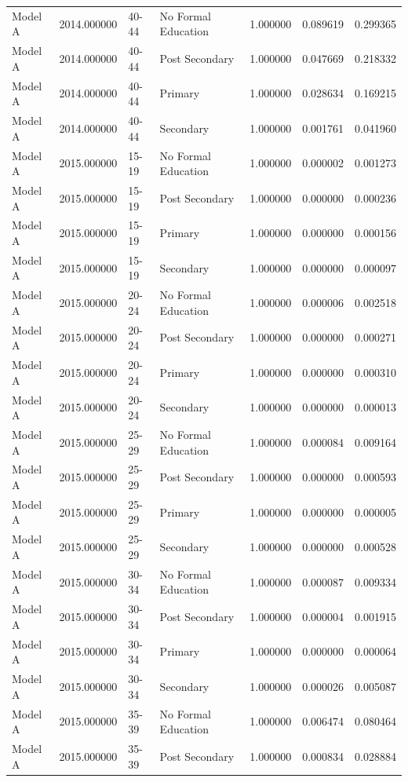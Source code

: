 \begin{table}[ht]
\begin{tabular}{lrllrrr}
Model A & 2014.000000 & 40-44 & No Formal Education & 1.000000 & 0.089619 & 0.299365 \\
Model A & 2014.000000 & 40-44 & Post Secondary & 1.000000 & 0.047669 & 0.218332 \\
Model A & 2014.000000 & 40-44 & Primary & 1.000000 & 0.028634 & 0.169215 \\
Model A & 2014.000000 & 40-44 & Secondary & 1.000000 & 0.001761 & 0.041960 \\
Model A & 2015.000000 & 15-19 & No Formal Education & 1.000000 & 0.000002 & 0.001273 \\
Model A & 2015.000000 & 15-19 & Post Secondary & 1.000000 & 0.000000 & 0.000236 \\
Model A & 2015.000000 & 15-19 & Primary & 1.000000 & 0.000000 & 0.000156 \\
Model A & 2015.000000 & 15-19 & Secondary & 1.000000 & 0.000000 & 0.000097 \\
Model A & 2015.000000 & 20-24 & No Formal Education & 1.000000 & 0.000006 & 0.002518 \\
Model A & 2015.000000 & 20-24 & Post Secondary & 1.000000 & 0.000000 & 0.000271 \\
Model A & 2015.000000 & 20-24 & Primary & 1.000000 & 0.000000 & 0.000310 \\
Model A & 2015.000000 & 20-24 & Secondary & 1.000000 & 0.000000 & 0.000013 \\
Model A & 2015.000000 & 25-29 & No Formal Education & 1.000000 & 0.000084 & 0.009164 \\
Model A & 2015.000000 & 25-29 & Post Secondary & 1.000000 & 0.000000 & 0.000593 \\
Model A & 2015.000000 & 25-29 & Primary & 1.000000 & 0.000000 & 0.000005 \\
Model A & 2015.000000 & 25-29 & Secondary & 1.000000 & 0.000000 & 0.000528 \\
Model A & 2015.000000 & 30-34 & No Formal Education & 1.000000 & 0.000087 & 0.009334 \\
Model A & 2015.000000 & 30-34 & Post Secondary & 1.000000 & 0.000004 & 0.001915 \\
Model A & 2015.000000 & 30-34 & Primary & 1.000000 & 0.000000 & 0.000064 \\
Model A & 2015.000000 & 30-34 & Secondary & 1.000000 & 0.000026 & 0.005087 \\
Model A & 2015.000000 & 35-39 & No Formal Education & 1.000000 & 0.006474 & 0.080464 \\
Model A & 2015.000000 & 35-39 & Post Secondary & 1.000000 & 0.000834 & 0.028884 \\

\end{tabular}
\end{table}

